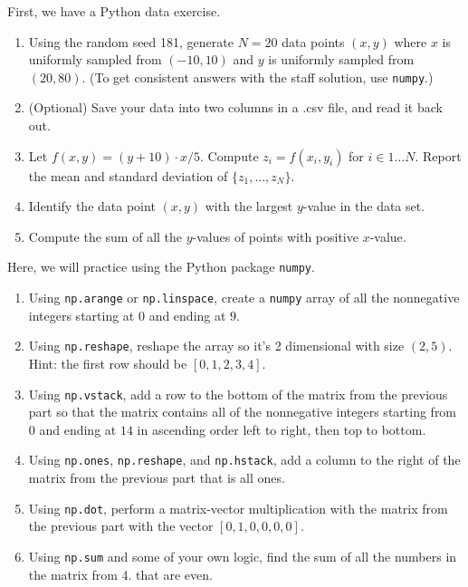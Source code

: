 \documentclass{harvardml}
\theoremstyle{definition}
\theoremstyle{plain}
\begin{document}
\begin{problem}
First, we have a Python data exercise.

\begin{enumerate}
    \item Using the random seed 181, generate $N = 20$ data points $(x,y)$ where $x$ is uniformly sampled from $(-10,10)$ and $y$ is uniformly sampled from $(20,80)$. (To get consistent answers with the staff solution, use \verb|numpy|.) 
    \item (Optional) Save your data into two columns in a .csv file, and read it back out. 
    \item Let $f(x,y) = (y+10) \cdot x/5$. Compute $z_i = f(x_i,y_i)$ for $i \in 1 \ldots N$. Report the mean and standard deviation of $\{z_1, \ldots, z_N\}$.
    \item Identify the data point $(x,y)$ with the largest $y$-value in the data set.
    \item Compute the sum of all the $y$-values of points with positive $x$-value.
\end{enumerate}
\end{problem}



\begin{problem}
Here, we will practice using the Python package \verb|numpy|.

\begin{enumerate}
    \item Using \verb|np.arange| or \verb|np.linspace|, create a \verb|numpy| array of all the nonnegative integers starting at $0$ and ending at $9$.
    \item Using \verb|np.reshape|, reshape the array so it's 2 dimensional with size $(2, 5)$. Hint: the first row should be $[0, 1,2,3,4]$.
    \item Using \verb|np.vstack|, add a row to the bottom of the matrix from the previous part so that the matrix contains all of the nonnegative integers starting from $0$ and ending at $14$ in ascending order left to right, then top to bottom.
    \item Using \verb|np.ones|, \verb|np.reshape|, and \verb|np.hstack|, add a column to the right of the matrix from the previous part that is all ones.
    \item Using \verb|np.dot|, perform a matrix-vector multiplication with the matrix from the previous part with the vector $[0, 1, 0, 0, 0, 0]$.
    \item Using \verb|np.sum| and some of your own logic, find the sum of all the numbers in the matrix from 4. that are even.
\end{enumerate}
\end{problem}
\end{document}
